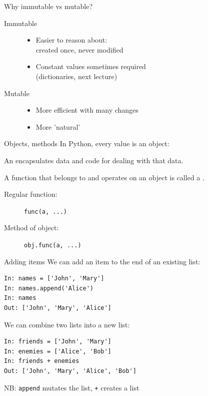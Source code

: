 \documentclass[aspectratio=169,usenames,dvipsnames]{beamer}
\begin{document}
\begin{frame}{Why immutable vs mutable?}
    \begin{description}
        \item[Immutable]
            \begin{itemize}
                \item Easier to reason about:\\
                    created once, never modified
                \item Constant values sometimes required\\
                    (dictionaries, next lecture)
            \end{itemize}

        \item[Mutable]
            \begin{itemize}
                \item More efficient with many changes
                \item More 'natural'
            \end{itemize}
    \end{description}
\end{frame}

\begin{frame}{Objects, methods}
    In Python, every value is an object:

    \begin{definition}
        An  encapsulates
        data and code for dealing with that data.

        A function that belongs to and operates on an object
        is called a .
    \end{definition}
   
    \begin{description}
        \item[Regular function:] \lstinline{func(a, ...)}
        \item[Method of object:] \lstinline{obj.func(a, ...)}
    \end{description}
\end{frame}

\begin{frame}[fragile]{Adding items}
We can add an item to the end of an existing list:
\begin{lstlisting} 
In: names = ['John', 'Mary']
In: names.append('Alice')
In: names
Out: ['John', 'Mary', 'Alice']
\end{lstlisting}

\pause
We can combine two lists into a new list:
\begin{lstlisting} 
In: friends = ['John', 'Mary']
In: enemies = ['Alice', 'Bob']
In: friends + enemies
Out: ['John', 'Mary', 'Alice', 'Bob']
\end{lstlisting}

\vspace{1em}
NB: \lstinline{append} mutates the list, \lstinline{+} creates a  list
\end{frame}
\end{document}
